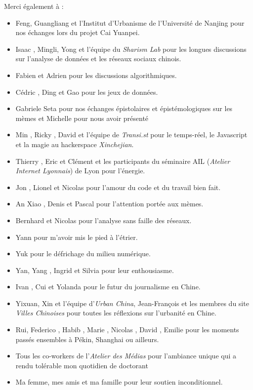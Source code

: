 Merci également à : 
\begin{itemize}
    \item {} Feng, {} Guangliang et l'Institut d'Urbanisme de l'Université de Nanjing pour  nos échanges lors du projet Cai Yuanpei.
    \item Isaac {}, {} Mingli, {} Yong et l'équipe du \textit{Sharism Lab} pour les longues discussions sur l'analyse de données et les réseaux sociaux chinois.
    \item Fabien {} et Adrien {} pour les discussions algorithmiques.
    \item Cédric {}, {} Ding et {} Gao pour les jeux de données.
    \item Gabriele {} Seta pour nos échanges épistolaires et épistémologiques sur les mèmes et Michelle {} pour nous avoir présenté
    \item  Min {}, Ricky {}, David {} et l'équipe de \textit{Transi.st} pour le temps-réel, le Javascript et la magie au hackerspace \textit{Xinchejian}.
    \item Thierry {}, Eric {} et Clément {} et les participants du séminaire AIL (\textit{Atelier Internet Lyonnais}) de Lyon pour l'énergie.
    \item Jon {}, Lionel {} et Nicolas {} pour l'amour du code et du travail bien fait.
    \item An Xiao {}, Denis {} et Pascal {} pour l'attention portée aux mèmes.
    \item Bernhard {} et Nicolas {} pour l'analyse sans faille des réseaux.
    \item Yann {} pour m'avoir mis le pied à l'étrier.
    \item Yuk {} pour le défrichage du milieu numérique.
    \item {} Yan, Yang {}, Ingrid {} et Silvia {} pour leur enthousiasme.
    \item Ivan {}, Cui {} et Yolanda {} pour le futur du journalisme en Chine.
    \item {} Yixuan, {} Xin et l'équipe d'\textit{Urban China}, Jean-François {} et les membres du site \textit{Villes Chinoises} pour toutes les réflexions sur l'urbanité en Chine.
    \item {} Rui, Federico {}, Habib {}, Marie {}, Nicolas {}, David {}, Emilie {} pour les moments passés ensembles à Pékin, Shanghai ou ailleurs.
    \item Tous les co-workers de l'\textit{Atelier des Médias} pour l'ambiance unique qui a rendu tolérable mon quotidien de doctorant
    \item Ma femme, mes amis et ma famille pour leur soutien inconditionnel.
\end{itemize}

